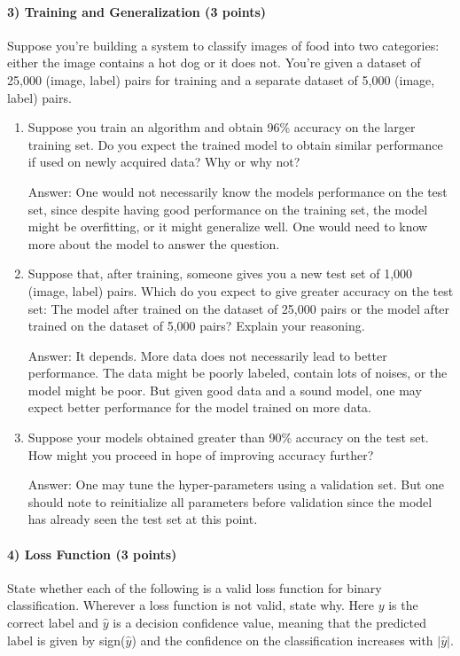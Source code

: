 \documentclass[11pt]{article}
\begin{document}
	\paragraph{3) Training and Generalization (3 points)} Suppose you're building a system to classify images of food into two categories: either the image contains a hot dog or it does not. You're given a dataset of 25,000 (image, label) pairs for training and a separate dataset of 5,000 (image, label) pairs.
	\begin{enumerate}
		\item Suppose you train an algorithm and obtain 96\% accuracy on the larger training set. Do you expect the trained model to obtain similar performance if used on newly acquired data? Why or why not?\newline
		
		Answer: One would not necessarily know the models performance on the test set, since despite having good performance on the training set, the model might be overfitting, or it might generalize well. One would need to know more about the model to answer the question.
		
		\item Suppose that, after training, someone gives you a new test set of 1,000 (image, label) pairs. Which do you expect to give greater accuracy on the test set: The model after trained on the dataset of 25,000 pairs or the model after trained on the dataset of 5,000 pairs? Explain your reasoning.\newline
		
		Answer: It depends. More data does not necessarily lead to better performance. The data might be poorly labeled, contain lots of noises, or the model might be poor. But given good data and a sound model, one may expect better performance for the model trained on more data.
		
		\item Suppose your models obtained greater than 90\% accuracy on the test set. How might you proceed in hope of improving accuracy further?\newline
		
		Answer: One may tune the hyper-parameters using a validation set. But one should note to reinitialize all parameters before validation since the model has already seen the test set at this point. 
	\end{enumerate}
	
	\paragraph{4) Loss Function (3 points)} State whether each of the following is a valid loss function 
	 for binary classification.  Wherever a loss function is not valid, state why. Here $y$ is the correct label and $\hat{y}$ is a decision confidence value, meaning that the predicted label is given by sign($\hat{y}$) and the confidence on the classification increases with $\vert\hat{y}\vert$.
	
\end{document}
